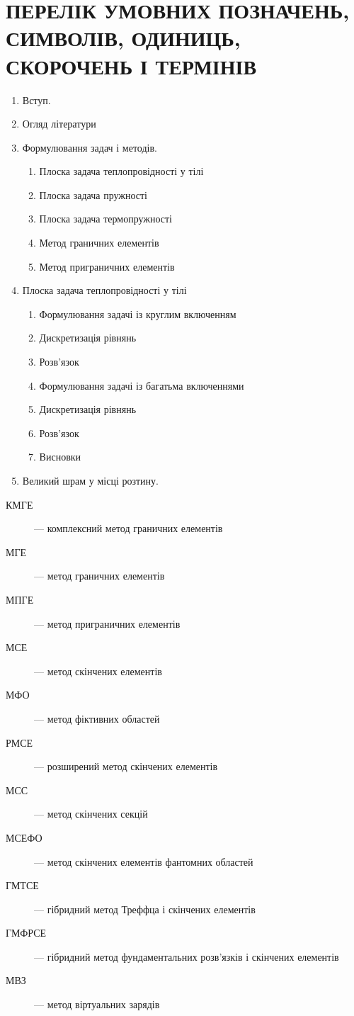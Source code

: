 \chapter{ПЕРЕЛІК УМОВНИХ ПОЗНАЧЕНЬ, СИМВОЛІВ, ОДИНИЦЬ, СКОРОЧЕНЬ І ТЕРМІНІВ}


\begin{enumerate}
  \item Вступ.
  \item Огляд літератури
  \item Формулювання задач і методів.
    \begin{enumerate}
      \item Плоска задача теплопровідності у тілі
      \item Плоска задача пружності
      \item Плоска задача термопружності
      \item Метод граничних елемен­тів
      \item Метод пригранич­них елемен­тів
    \end{enumerate}
  \item Плоска задача теплопровідності у тілі
    \begin{enumerate}
      \item Формулювання задачі із круглим включенням
      \item Дискретизація рівнянь 
      \item Розв'язок
      \item Формулювання задачі із багатьма включеннями
      \item Дискретизація рівнянь 
      \item Розв'язок
      \item Висновки
    \end{enumerate}
  \item Великий шрам у місці розтину.
\end{enumerate}


\begin{description}
  \item[КМГЕ] --- комплексний метод граничних елементів 
  \item[МГЕ] --- метод граничних елементів
  \item[МПГЕ] --- метод приграничних елементів
  \item[МСЕ] --- метод скінчених елементів
  \item[МФО] --- метод фіктивних областей
  \item[РМСЕ] --- розширений метод скінчених елементів
  \item[МСС] --- метод скінчених секцій 
  \item[МСЕФО] --- метод скінчених елементів фантомних областей 
  \item[ГМТСЕ] --- гібридний метод Треффца і скінчених елементів
  \item[ГМФРСЕ] --- гібридний метод фундаментальних розв'язків і скінчених елементів
  \item[МВЗ] --- метод віртуальних зарядів
\end{description}